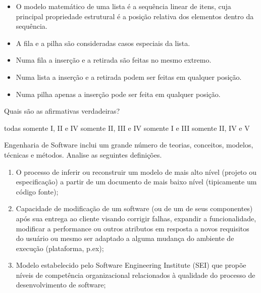\documentclass[12pt, addpoints]{exam}
\begin{document}
\begin{questions}
\begin{itemize}
    \item O modelo matemático de uma lista é a sequência linear de itens, cuja principal propriedade estrutural é a posição relativa dos elementos dentro da sequência.

    \item A fila e a pilha são consideradas casos especiais da lista.

    \item Numa fila a inserção e a retirada são feitas no mesmo extremo.

    \item Numa lista a inserção e a retirada podem ser feitas em qualquer posição.

    \item Numa pilha apenas a inserção pode ser feita em qualquer posição.

\end{itemize}



Quais são as afirmativas verdadeiras?
\begin{choices}
\choice todas
\choice somente I, II e IV
\choice somente II, III e IV
\choice somente I e III
\choice somente II, IV e V
\end{choices}

\question

Engenharia de Software inclui um grande número de teorias, conceitos, modelos, técnicas e métodos. Analise as seguintes definições.

\begin{enumerate}[label=\Roman*.]

    \item O processo de inferir ou reconstruir um modelo de mais alto nível (projeto ou especificação) a partir de um documento de mais baixo nível (tipicamente um código fonte);

    \item Capacidade de modificação de um software (ou de um de seus componentes) após sua entrega ao cliente visando corrigir falhas, expandir a funcionalidade, modificar a performance ou outros atributos em resposta a novos requisitos do usuário ou mesmo ser adaptado a alguma mudança do ambiente de execução (plataforma, p.ex);

    \item Modelo estabelecido pelo Software Engineering Institute (SEI) que propõe níveis de competência organizacional relacionados à qualidade do processo de desenvolvimento de software;


\end{enumerate}
\end{questions}
\end{document}
